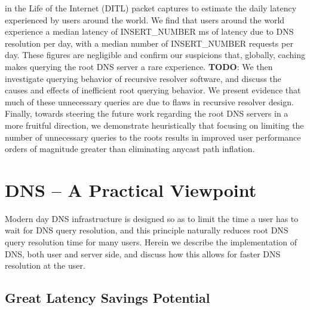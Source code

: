 \documentclass[sigconf,nonacm,10pt]{acmart}
\begin{document}
in the Life of the Internet (DITL) \cite{ditl} packet captures to
estimate the daily latency experienced by users around the world. We
find that users around the world experience a median latency of
INSERT\_NUMBER ms of latency due to DNS resolution per day, with a
median number of INSERT\_NUMBER requests per day. These figures are
negligible and confirm our suspicions that, globally, caching makes
querying the root DNS server a rare experience. \textbf{TODO}: We then
investigate querying behavior of recursive resolver software, and
discuss the causes and effects of inefficient root querying behavior. We
present evidence that much of these unnecessary queries are due to flaws
in recursive resolver design. Finally, towards steering the future work
regarding the root DNS servers in a more fruitful direction, we
demonstrate heuristically that focusing on limiting the number of
unnecessary queries to the roots results in improved user performance
orders of magnitude greater than eliminating anycast path inflation.

\section{DNS -- A Practical
Viewpoint}\label{dns-a-practical-viewpoint-1}

\label{sec:dns_practical_viewpoint} Modern day DNS infrastructure is
designed so as to limit the time a user has to wait for DNS query
resolution, and this principle naturally reduces root DNS query
resolution time for many users. Herein we describe the implementation of
DNS, both user and server side, and discuss how this allows for faster
DNS resolution at the user.

\subsection{Great Latency Savings
Potential}\label{great-latency-savings-potential-1}
\end{document}
